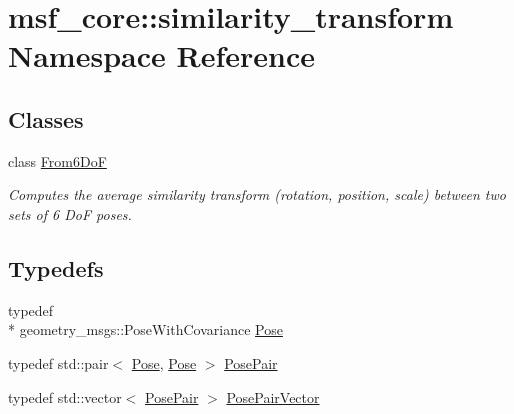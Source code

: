 \hypertarget{namespacemsf__core_1_1similarity__transform}{\section{msf\-\_\-core\-:\-:similarity\-\_\-transform Namespace Reference}
\label{namespacemsf__core_1_1similarity__transform}
}
\subsection*{Classes}
\begin{DoxyCompactItemize}
\item 
class \hyperlink{classmsf__core_1_1similarity__transform_1_1From6DoF}{From6\-Do\-F}
\begin{DoxyCompactList}\small\item\em Computes the average similarity transform (rotation, position, scale) between two sets of 6 Do\-F poses. \end{DoxyCompactList}\end{DoxyCompactItemize}
\subsection*{Typedefs}
\begin{DoxyCompactItemize}
\item 
typedef \\*
geometry\-\_\-msgs\-::\-Pose\-With\-Covariance \hyperlink{namespacemsf__core_1_1similarity__transform_a7ecde3e7b02bda457b404fc49b03179f}{Pose}
\item 
typedef std\-::pair$<$ \hyperlink{namespacemsf__core_1_1similarity__transform_a7ecde3e7b02bda457b404fc49b03179f}{Pose}, \hyperlink{namespacemsf__core_1_1similarity__transform_a7ecde3e7b02bda457b404fc49b03179f}{Pose} $>$ \hyperlink{namespacemsf__core_1_1similarity__transform_aaf333aba3d1f81a96f7294f05f311590}{Pose\-Pair}
\item 
typedef std\-::vector$<$ \hyperlink{namespacemsf__core_1_1similarity__transform_aaf333aba3d1f81a96f7294f05f311590}{Pose\-Pair} $>$ \hyperlink{namespacemsf__core_1_1similarity__transform_aa03b1c4b07f85bede2f9cad021e3df7a}{Pose\-Pair\-Vector}
\end{DoxyCompactItemize}


